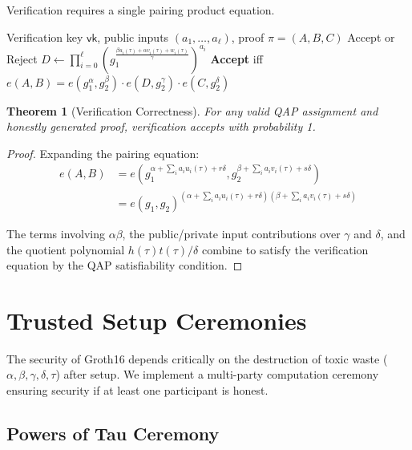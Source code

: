 \documentclass[11pt,a4paper]{article}
\newtheorem{theorem}{Theorem}[section]
\newcommand{\pair}[2]{e(#1, #2)}
\begin{document}
Verification requires a single pairing product equation.

\begin{algorithm}
\caption{Groth16 Verify}
\label{alg:verify}
\begin{algorithmic}[1]
\Require Verification key $\mathsf{vk}$, public inputs $(a_1, \ldots, a_\ell)$, proof $\pi = (A, B, C)$
\Ensure Accept or Reject
\State $D \gets \prod_{i=0}^\ell (g_1^{\frac{\beta u_i(\tau) + \alpha v_i(\tau) + w_i(\tau)}{\gamma}})^{a_i}$
\State \textbf{Accept} iff $\pair{A}{B} = \pair{g_1^\alpha}{g_2^\beta} \cdot \pair{D}{g_2^\gamma} \cdot \pair{C}{g_2^\delta}$
\end{algorithmic}
\end{algorithm}

\begin{theorem}[Verification Correctness]
For any valid QAP assignment and honestly generated proof, verification accepts with probability 1.
\end{theorem}

\begin{proof}
Expanding the pairing equation:
\begin{align*}
\pair{A}{B} &= \pair{g_1^{\alpha + \sum_i a_i u_i(\tau) + r\delta}}{g_2^{\beta + \sum_i a_i v_i(\tau) + s\delta}} \\
&= e(g_1, g_2)^{(\alpha + \sum_i a_i u_i(\tau) + r\delta)(\beta + \sum_i a_i v_i(\tau) + s\delta)}
\end{align*}

The terms involving $\alpha\beta$, the public/private input contributions over $\gamma$ and $\delta$, and the quotient polynomial $h(\tau)t(\tau)/\delta$ combine to satisfy the verification equation by the QAP satisfiability condition.
\end{proof}

\section{Trusted Setup Ceremonies}
\label{sec:trusted-setup}

The security of Groth16 depends critically on the destruction of toxic waste ($\alpha, \beta, \gamma, \delta, \tau$) after setup. We implement a multi-party computation ceremony ensuring security if at least one participant is honest.

\subsection{Powers of Tau Ceremony}
\end{document}
